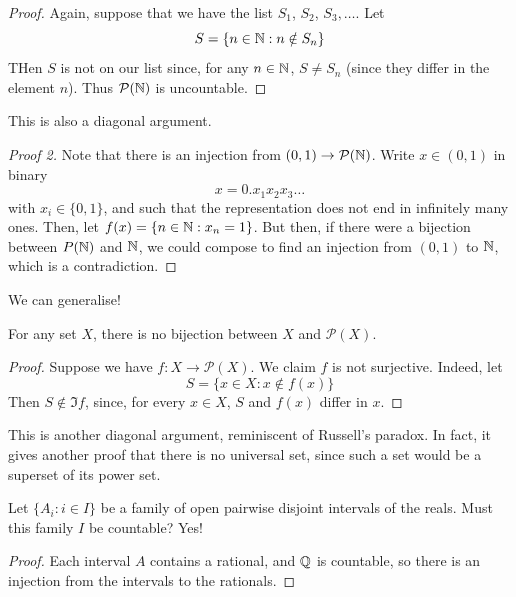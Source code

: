 \documentclass{../template/note}
\begin{document}
    \begin{proof}
        Again, suppose that we have the list \(S_1\), \(S_2\), \(S_3, \dots\). Let
        \[
            S = \{n \in \mathbb N: n \notin S_n\}
        \]
        THen \(S\) is not on our list since, for any \(n \in \mathbb N\), \(S \neq S_n\) (since they differ in the element \(n\)). Thus \(\mathcal P(\mathbb N)\) is uncountable.
    \end{proof}
    
    This is also a diagonal argument.

    \begin{proof}[Proof 2]
        Note that there is an injection from \((0, 1) \to \mathcal P(\mathbb N)\). Write \(x \in (0, 1)\) in binary
        \[
            x = 0.x_1x_2x_3\dots
        \]
        with \(x_i \in \{0, 1\}\), and such that the representation does not end in infinitely many ones. Then, let \(f(x) = \{n \in \mathbb N: x_n = 1\}\). But then, if there were a bijection between \(P(\mathbb N)\) and \(\mathbb N\), we could compose to find an injection from \((0, 1)\) to \(\mathbb N\), which is a contradiction.
    \end{proof}

    We can generalise!
    
    \begin{theorem}[Cantor]
        For any set \(X\), there is no bijection between \(X\) and \(\mathcal P(X)\).
    \end{theorem}
    
    \begin{proof}
        Suppose we have \(f: X \to \mathcal P(X)\). We claim \(f\) is not surjective. Indeed, let
        \[
            S = \{x \in X: x \notin f(x)\}
        \]
        Then \(S \notin \Im f\), since, for every \(x \in X\), \(S\) and \(f(x)\) differ in \(x\).
    \end{proof}
    
    This is another diagonal argument, reminiscent of Russell's paradox. In fact, it gives another proof that there is no universal set, since such a set would be a superset of its power set.
    
    \begin{example}
        Let \(\{A_i: i \in I\}\) be a family of open pairwise disjoint intervals of the reals. Must this family \(I\) be countable? Yes!
    \end{example}
    
    \begin{proof}
        Each interval \(A\) contains a rational, and \(\mathbb Q\) is countable, so there is an injection from the intervals to the rationals.
    \end{proof}
    
\end{document}
